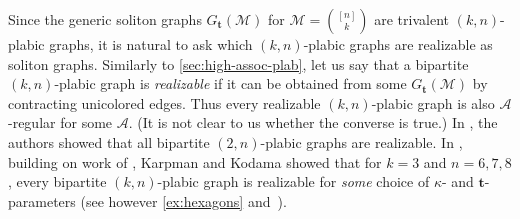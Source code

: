 \documentclass[11pt]{amsart}
\theoremstyle{plain}
\theoremstyle{definition}
\def\t{{\bm{t}}}
\def\A{\mathcal{A}}
\begin{document}
Since the generic soliton graphs 
 $G_{\t}(\mathcal{M})$
for $\mathcal{M} = {[n] \choose k}$ are trivalent $(k,n)$-plabic graphs, it is natural to ask which $(k,n)$-plabic graphs
are realizable as soliton graphs. Similarly to \cref{sec:high-assoc-plab}, let us say that a bipartite $(k,n)$-plabic graph is \emph{realizable} if it can be obtained from some $G_{\t}(\mathcal{M})$ by contracting unicolored edges. Thus every realizable $(k,n)$-plabic graph is also $\A$-regular for some $\A$. (It is not clear to us whether the converse is true.) In \cite{KW, KW2}, the authors showed that all bipartite $(2,n)$-plabic graphs are realizable.  In \cite{KK}, building on work of \cite{Huang}, Karpman and Kodama showed that for $k=3$ and $n=6,7,8$, every bipartite $(k,n)$-plabic graph  is realizable for \emph{some} choice of $\kappa$- and $\t$-parameters (see however \cref{ex:hexagons} and~\cite[Theorem~4.2]{KK}).


\newcommand{\arxiv}[1]{\href{https://arxiv.org/abs/#1}{\textup{\texttt{arXiv:#1}}}}




\end{document}

